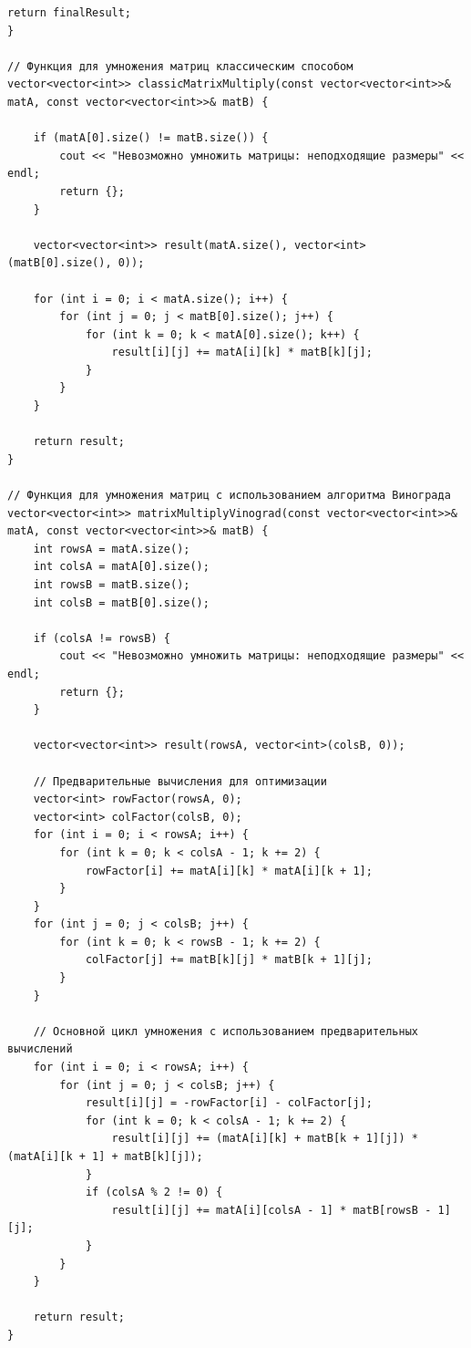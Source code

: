 \documentclass[12pt, a4paper]{article}
\begin{document}
\begin{lstlisting}[caption={Исходный код}, label={lst:label1}]
    return finalResult;
}

// Функция для умножения матриц классическим способом
vector<vector<int>> classicMatrixMultiply(const vector<vector<int>>& matA, const vector<vector<int>>& matB) {

    if (matA[0].size() != matB.size()) {
        cout << "Невозможно умножить матрицы: неподходящие размеры" << endl;
        return {};
    }

    vector<vector<int>> result(matA.size(), vector<int>(matB[0].size(), 0));

    for (int i = 0; i < matA.size(); i++) {
        for (int j = 0; j < matB[0].size(); j++) {
            for (int k = 0; k < matA[0].size(); k++) {
                result[i][j] += matA[i][k] * matB[k][j];
            }
        }
    }

    return result;
}

// Функция для умножения матриц с использованием алгоритма Винограда
vector<vector<int>> matrixMultiplyVinograd(const vector<vector<int>>& matA, const vector<vector<int>>& matB) {
    int rowsA = matA.size();
    int colsA = matA[0].size();
    int rowsB = matB.size();
    int colsB = matB[0].size();

    if (colsA != rowsB) {
        cout << "Невозможно умножить матрицы: неподходящие размеры" << endl;
        return {};
    }

    vector<vector<int>> result(rowsA, vector<int>(colsB, 0));

    // Предварительные вычисления для оптимизации
    vector<int> rowFactor(rowsA, 0);
    vector<int> colFactor(colsB, 0);
    for (int i = 0; i < rowsA; i++) {
        for (int k = 0; k < colsA - 1; k += 2) {
            rowFactor[i] += matA[i][k] * matA[i][k + 1];
        }
    }
    for (int j = 0; j < colsB; j++) {
        for (int k = 0; k < rowsB - 1; k += 2) {
            colFactor[j] += matB[k][j] * matB[k + 1][j];
        }
    }

    // Основной цикл умножения с использованием предварительных вычислений
    for (int i = 0; i < rowsA; i++) {
        for (int j = 0; j < colsB; j++) {
            result[i][j] = -rowFactor[i] - colFactor[j];
            for (int k = 0; k < colsA - 1; k += 2) {
                result[i][j] += (matA[i][k] + matB[k + 1][j]) * (matA[i][k + 1] + matB[k][j]);
            }
            if (colsA % 2 != 0) {
                result[i][j] += matA[i][colsA - 1] * matB[rowsB - 1][j];
            }
        }
    }

    return result;
}


\end{lstlisting}
\end{document}
